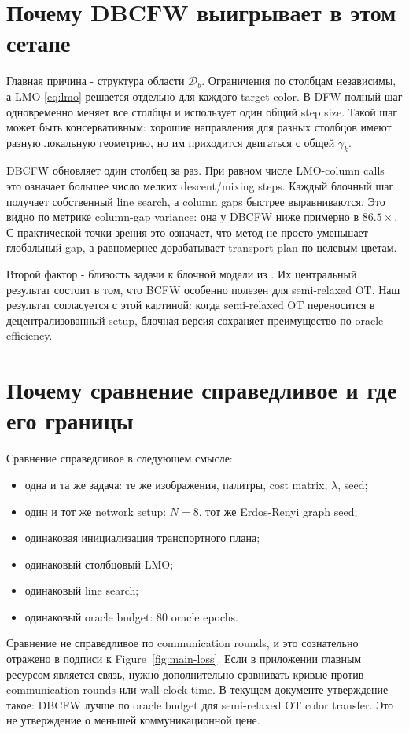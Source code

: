 \documentclass[11pt,a4paper]{article}
\newcommand{\1}{\mathbf{1}}
\begin{document}
\section{Почему DBCFW выигрывает в этом сетапе}

Главная причина - структура области $\mathcal{D}_b$. Ограничения по столбцам независимы, а LMO \eqref{eq:lmo} решается отдельно для каждого target color. В DFW полный шаг одновременно меняет все столбцы и использует один общий step size. Такой шаг может быть консервативным: хорошие направления для разных столбцов имеют разную локальную геометрию, но им приходится двигаться с общей $\gamma_k$.

DBCFW обновляет один столбец за раз. При равном числе LMO-column calls это означает большее число мелких descent/mixing steps. Каждый блочный шаг получает собственный line search, а column gaps быстрее выравниваются. Это видно по метрике column-gap variance: она у DBCFW ниже примерно в $86.5\times$. С практической точки зрения это означает, что метод не просто уменьшает глобальный gap, а равномернее дорабатывает transport plan по целевым цветам.

Второй фактор - близость задачи к блочной модели из \citet{fukunaga2021fast}. Их центральный результат состоит в том, что BCFW особенно полезен для semi-relaxed OT. Наш результат согласуется с этой картиной: когда semi-relaxed OT переносится в децентрализованный setup, блочная версия сохраняет преимущество по oracle-efficiency.

\section{Почему сравнение справедливое и где его границы}

Сравнение справедливое в следующем смысле:
\begin{itemize}
  \item одна и та же задача: те же изображения, палитры, cost matrix, $\lambda$, seed;
  \item один и тот же network setup: $N=8$, тот же Erdos-Renyi graph seed;
  \item одинаковая инициализация транспортного плана;
  \item одинаковый столбцовый LMO;
  \item одинаковый line search;
  \item одинаковый oracle budget: $80$ oracle epochs.
\end{itemize}

Сравнение не справедливое по communication rounds, и это сознательно отражено в подписи к Figure~\ref{fig:main-loss}. Если в приложении главным ресурсом является связь, нужно дополнительно сравнивать кривые против communication rounds или wall-clock time. В текущем документе утверждение такое: DBCFW лучше по oracle budget для semi-relaxed OT color transfer. Это не утверждение о меньшей коммуникационной цене.
\end{document}
